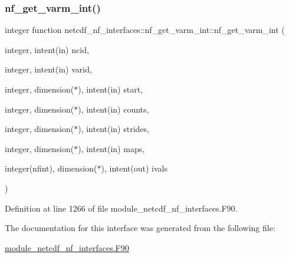\subsubsection{\texorpdfstring{nf\+\_\+get\+\_\+varm\+\_\+int()}{nf\_get\_varm\_int()}}
{\footnotesize\ttfamily integer function netcdf\+\_\+nf\+\_\+interfaces\+::nf\+\_\+get\+\_\+varm\+\_\+int\+::nf\+\_\+get\+\_\+varm\+\_\+int (\begin{DoxyParamCaption}\item[{integer, intent(in)}]{ncid,  }\item[{integer, intent(in)}]{varid,  }\item[{integer, dimension($\ast$), intent(in)}]{start,  }\item[{integer, dimension($\ast$), intent(in)}]{counts,  }\item[{integer, dimension($\ast$), intent(in)}]{strides,  }\item[{integer, dimension($\ast$), intent(in)}]{maps,  }\item[{integer(nfint), dimension($\ast$), intent(out)}]{ivals }\end{DoxyParamCaption})}



Definition at line 1266 of file module\+\_\+netcdf\+\_\+nf\+\_\+interfaces.\+F90.



The documentation for this interface was generated from the following file\+:\begin{DoxyCompactItemize}
\item 
\hyperlink{module__netcdf__nf__interfaces_8F90}{module\+\_\+netcdf\+\_\+nf\+\_\+interfaces.\+F90}\end{DoxyCompactItemize}
